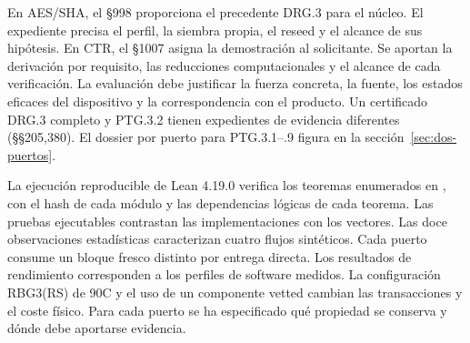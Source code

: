 \documentclass[11pt,a4paper]{article}
\begin{document}
En AES/SHA, el §998 proporciona el precedente DRG.3 para el núcleo. El expediente
precisa el perfil, la siembra propia, el reseed y el alcance de sus hipótesis.
En CTR, el §1007 asigna la demostración al solicitante. Se aportan la derivación
por requisito, las reducciones computacionales y el alcance de cada verificación.
La evaluación debe justificar la fuerza concreta, la fuente, los estados eficaces del dispositivo y
la correspondencia con el producto. Un certificado DRG.3 completo y PTG.3.2
tienen expedientes de evidencia diferentes (§§205,380). El dossier por puerto
para PTG.3.1--.9 figura en la sección~\ref{sec:dos-puertos}.

La ejecución reproducible de Lean 4.19.0 verifica los teoremas enumerados
en , con el hash de cada módulo y las
dependencias lógicas de cada teorema. Las pruebas ejecutables contrastan
las implementaciones con los vectores. Las doce observaciones estadísticas
caracterizan cuatro flujos sintéticos. Cada puerto consume un bloque fresco distinto por entrega directa. Los resultados de rendimiento corresponden a los perfiles de software medidos. La configuración RBG3(RS) de 90C y el uso de un componente
vetted cambian las transacciones y el coste físico. Para cada puerto se ha
especificado qué propiedad se conserva y dónde debe aportarse evidencia.
\end{document}
